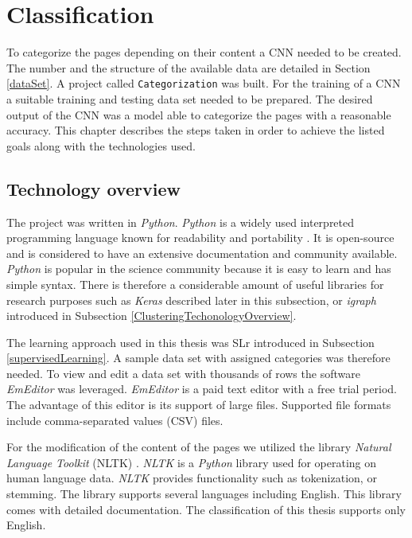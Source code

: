 \section{Classification} \label{ClassificationDevelopment}
To categorize the pages depending on their content a CNN needed to be created. The number and the structure of the available data are detailed in Section \ref{dataSet}. A project called \texttt{Categorization} was built. For the training of a CNN a suitable training and testing data set needed to be prepared. The desired output of the CNN was a model able to categorize the pages with a reasonable accuracy. This chapter describes the steps taken in order to achieve the listed goals along with the technologies used.

\subsection{Technology overview} \label{ClassificationTechonologyOverview}
The project was written in \textit{Python}. \textit{Python} is a widely used interpreted programming language known for readability and portability \cite{aboutPython}. It is open-source and is considered to have an extensive documentation and community available. \textit{Python} is popular in the science community because it is easy to learn and has simple syntax. There is therefore a considerable amount of useful libraries for research purposes such as \textit{Keras} described later in this subsection, or \textit{igraph} introduced in Subsection \ref{ClusteringTechonologyOverview}.  

The learning approach used in this thesis was SLr introduced in Subsection \ref{supervisedLearning}. A sample data set with assigned categories was therefore needed. To view and edit a data set with thousands of rows the software \textit{EmEditor} \cite{emeditor} was leveraged. \textit{EmEditor} is a paid text editor with a free trial period. The advantage of this editor is its support of large files. Supported file formats include comma-separated values (CSV) files. 

For the modification of the content of the pages we utilized the library \textit{Natural Language Toolkit} (NLTK) \cite{nltk}. \textit{NLTK} is a \textit{Python} library used for operating on human language data. \textit{NLTK} provides functionality such as tokenization, or stemming. The library supports several languages including English. This library comes with detailed documentation. The classification of this thesis supports only English.

